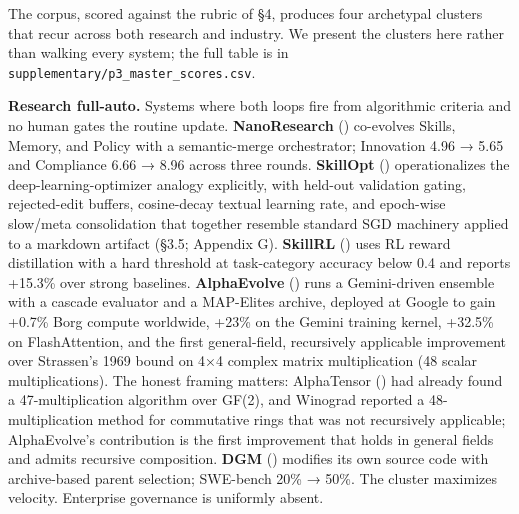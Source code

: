 \documentclass[
]{article}
\begin{document}
The corpus, scored against the rubric of §4, produces four archetypal
clusters that recur across both research and industry. We present the
clusters here rather than walking every system; the full table is in
\texttt{supplementary/p3\_master\_scores.csv}.

\textbf{Research full-auto.} Systems where both loops fire from
algorithmic criteria and no human gates the routine update.
\textbf{NanoResearch} () co-evolves Skills, Memory, and Policy with a semantic-merge
orchestrator; Innovation 4.96 → 5.65 and Compliance 6.66 → 8.96 across
three rounds. \textbf{SkillOpt} () operationalizes the deep-learning-optimizer analogy
explicitly, with held-out validation gating, rejected-edit buffers,
cosine-decay textual learning rate, and epoch-wise slow/meta
consolidation that together resemble standard SGD machinery applied to a
markdown artifact (§3.5; Appendix G). \textbf{SkillRL}
() uses RL reward
distillation with a hard threshold at task-category accuracy below 0.4
and reports +15.3\% over strong baselines. \textbf{AlphaEvolve}
() runs a
Gemini-driven ensemble with a cascade evaluator and a MAP-Elites
archive, deployed at Google to gain +0.7\% Borg compute worldwide, +23\%
on the Gemini training kernel, +32.5\% on FlashAttention, and the first
general-field, recursively applicable improvement over Strassen's 1969
bound on 4×4 complex matrix multiplication (48 scalar multiplications).
The honest framing matters: AlphaTensor
() had already
found a 47-multiplication algorithm over GF(2), and Winograd reported a
48-multiplication method for commutative rings that was not recursively
applicable; AlphaEvolve's contribution is the first improvement that
holds in general fields and admits recursive composition. \textbf{DGM}
() modifies its
own source code with archive-based parent selection; SWE-bench 20\% →
50\%. The cluster maximizes velocity. Enterprise governance is uniformly
absent.
\end{document}
